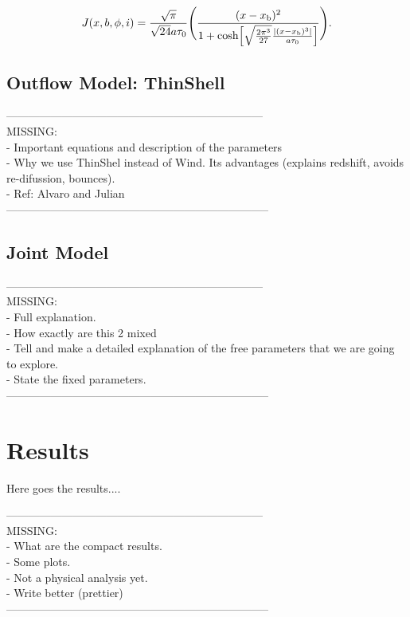\documentclass{latex/emulateapj}
\begin{document}
\begin{equation}
J(x,b,\phi,i)=\frac{\sqrt{\pi}}{\sqrt{24}a\tau_0}\Bigg{(}\frac{(x-x_{\rm
    b})^2}{1+{\rm cosh}\Big{[}\sqrt{\frac{2\pi^3}{27}}\frac{|(x
      -x_{\rm b})^3|}{a\tau_0}\Big{]}}\Bigg{)}.
\end{equation}



\subsection{Outflow Model: ThinShell}

---------------------------------------------------------------------\\
MISSING:\\
- Important equations and description of the parameters\\
- Why we use ThinShel instead of Wind. Its advantages (explains redshift, avoids re-difussion, bounces).\\
- Ref: Alvaro and Julian\\
-----------------------------------------------------------------------\\

\subsection{Joint Model}

---------------------------------------------------------------------\\
MISSING: \\
- Full explanation.\\
- How exactly are this 2 mixed\\
- Tell and make a detailed explanation of the free parameters that we are going to explore. \\
- State the fixed parameters.\\
-----------------------------------------------------------------------\\

\section{Results}
\label{sec:results}
Here goes the results....

---------------------------------------------------------------------\\
MISSING: \\
- What are the compact results.\\
- Some plots.\\
- Not a physical analysis yet. \\
- Write better (prettier)\\
-----------------------------------------------------------------------\\
\end{document}
